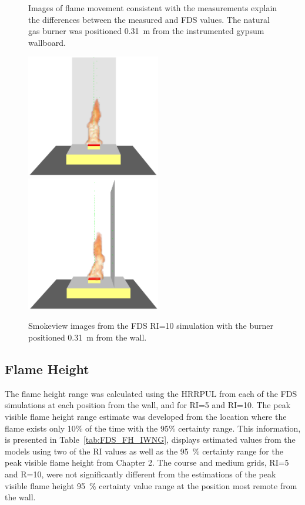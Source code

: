 \documentclass[twoside]{uocthesis}
\begin{document}
{\begin{figure}[ht!]
  \caption[Images of flame movement consistent with the measurements and explain the differences between the measured and FDS values.]{Images of flame movement consistent with the measurements explain the differences between the measured and FDS values.  The natural gas burner was positioned 0.31~m from the instrumented gypsum wallboard.}
  \label{FDS_IWNG_Flame_comp}
\end{figure}

\begin{figure}[h]
  \centering
  \includegraphics[width=2.3in]{../Figures/FDS_NG_80kW_GBWall_frontview}
  \includegraphics[width=2.3in]{../Figures/FDS_NG_80kW_GBWall_sideview}   \\
  \caption[Smokeview images from the FDS RI=10 simulation with the burner positioned at 0.31~m from the wall.] {Smokeview images from the FDS RI=10 simulation with the burner positioned 0.31~m from the wall.}
  \label{FDS_IWNG_SMV_comp}
\end{figure}


\subsection{Flame Height}

The flame height range was calculated using the HRRPUL from each of the FDS simulations at each position from the wall, and for RI=5 and RI=10.  The peak visible flame height range estimate was developed from the location where the flame exists only 10\% of the time with the 95\% certainty range.  This information, is presented in Table~\ref{tab:FDS_FH_IWNG}, displays estimated values from the models using two of the RI values as well as the 95~$\%$ certainty range for the peak visible flame height from Chapter 2.  The course and medium grids, RI=5 and R=10, were not significantly different from the estimations of the peak visible flame height 95~$\%$ certainty value range at the position most remote from the wall.

}
\end{document}
